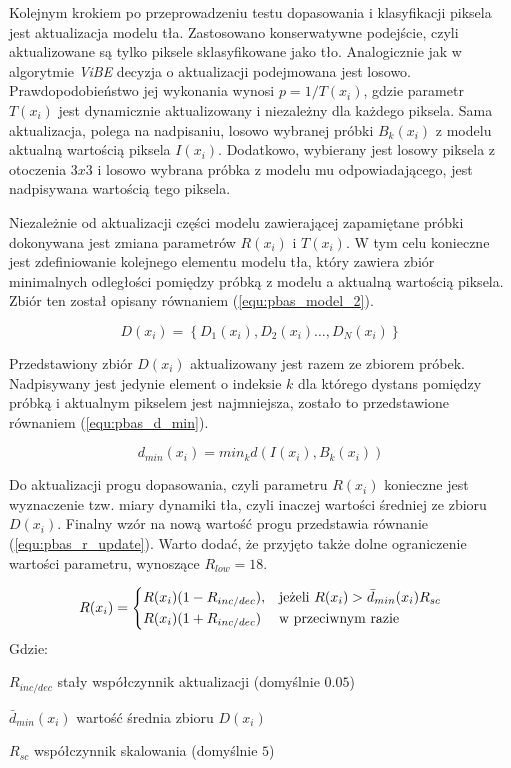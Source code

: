 Kolejnym krokiem po przeprowadzeniu testu dopasowania i klasyfikacji piksela jest aktualizacja modelu tła. Zastosowano konserwatywne podejście, czyli aktualizowane są tylko piksele sklasyfikowane jako tło. Analogicznie jak w algorytmie \textit{ViBE} decyzja o aktualizacji podejmowana jest losowo. Prawdopodobieństwo jej wykonania wynosi $p = 1/T(x_i)$, gdzie parametr $T(x_i)$ jest dynamicznie aktualizowany i niezależny dla każdego piksela. Sama aktualizacja, polega na nadpisaniu, losowo wybranej próbki $B_k(x_i)$ z modelu aktualną wartością piksela $I(x_i)$. Dodatkowo, wybierany jest losowy piksela z otoczenia $3x3$ i losowo wybrana próbka z modelu mu odpowiadającego, jest nadpisywana wartością tego piksela.

Niezależnie od aktualizacji części modelu zawierającej zapamiętane próbki dokonywana jest zmiana parametrów $R(x_i)$ i $T(x_i)$. W tym celu konieczne jest zdefiniowanie kolejnego elementu modelu tła, który zawiera zbiór minimalnych odległości pomiędzy próbką z modelu a aktualną wartością piksela. Zbiór ten został opisany równaniem (\ref{equ:pbas_model_2}). 
 
	\begin{equation}
		D(x_i)= \left\{ D_1(x_i), D_2(x_i) \dotsc, D_N(x_i) \right\}
	\label{equ:pbas_model_2}	
	\end{equation}

Przedstawiony zbiór $D(x_i)$ aktualizowany jest razem ze zbiorem próbek. Nadpisywany jest jedynie element o indeksie $k$ dla którego dystans pomiędzy próbką i aktualnym pikselem jest najmniejsza, zostało to przedstawione równaniem (\ref{equ:pbas_d_min}).
	
	\begin{equation}
		d_{min}(x_i) = min_k d(I(x_i), B_k(x_i))
	\label{equ:pbas_d_min}	
	\end{equation}

Do aktualizacji progu dopasowania, czyli parametru $R(x_i)$ konieczne jest wyznaczenie tzw. miary dynamiki tła, czyli inaczej wartości średniej ze zbioru $D(x_i)$. Finalny wzór na nową wartość progu przedstawia równanie (\ref{equ:pbas_r_update}). Warto dodać, że przyjęto także dolne ograniczenie wartości parametru, wynoszące $R_{low} = 18$.
    
    \begin{equation}
	    R(x_i) = 
		\begin{dcases}
    		R(x_i)(1-R_{inc/dec}), & \text{jeżeli } R(x_i) > \bar{d}_{min}(x_i)R_{sc} \\
    		R(x_i)(1+R_{inc/dec}) & \text{w przeciwnym razie} 
		\end{dcases}
	\label{equ:pbas_r_update}	
	\end{equation}
Gdzie:
\begin{eqwhere}[2.2cm]
	\item[$R_{inc/dec}$] stały współczynnik aktualizacji (domyślnie $0.05$)
	\item[$\bar{d}_{min}(x_i)$] wartość średnia zbioru $D(x_i)$
	\item[$R_{sc}$] współczynnik skalowania (domyślnie $5$)
\end{eqwhere}

